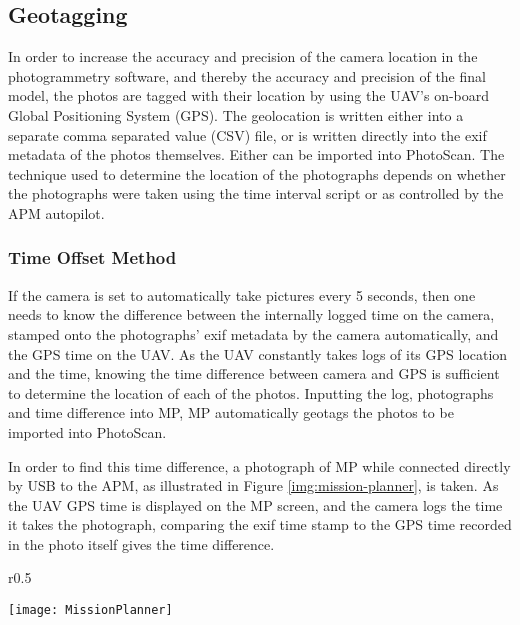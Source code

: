 \subsection{Geotagging}
\label{sec:methods/geotagging}

In order to increase the accuracy and precision of the camera location in the
photogrammetry software, and thereby the accuracy and precision of the final
model, the photos are tagged with their location by using the UAV's on-board
Global Positioning System (GPS). The geolocation is written either into a
separate comma separated value (CSV) file, or is written directly into the exif
metadata of the photos themselves. Either can be imported into PhotoScan. The
technique used to determine the location of the photographs depends on whether
the photographs were taken using the time interval script or as controlled by
the APM autopilot.

\subsubsection{Time Offset Method}

If the camera is set to automatically take pictures every 5 seconds, then one
needs to know the difference between the internally logged time on the camera,
stamped onto the photographs' exif metadata by the camera automatically, and the
GPS time on the UAV. As the UAV constantly takes logs of its GPS location and
the time, knowing the time difference between camera and GPS is sufficient to
determine the location of each of the photos. Inputting the log, photographs and
time difference into MP, MP automatically geotags the photos to be imported into
PhotoScan.

In order to find this time difference, a photograph of MP while connected
directly by USB to the APM, as illustrated in Figure \ref{img:mission-planner},
is taken. As the UAV GPS time is displayed on the MP screen, and the camera logs
the time it takes the photograph, comparing the exif time stamp to the GPS time
recorded in the photo itself gives the time difference.

\begin{wrapfigure}{r}{0.5\textwidth}
    \begin{center}
        \texttt{[image: MissionPlanner]}
        \caption{A photograph taken of MP while connected directly to the APM,
            giving the offset between the camera time and the UAV GPS time.}
        \label{img:mission-planner}
    \end{center}
\end{wrapfigure}

